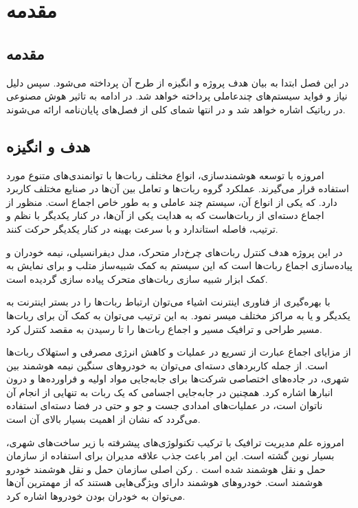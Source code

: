 \chapter{مقدمه}

\section{مقدمه}

در این فصل ابتدا به بیان هدف پروژه و انگیزه از طرح آن پرداخته می‌شود. سپس دلیل نیاز و فواید سیستم‌های چندعاملی پرداخته خواهد شد. در ادامه به تاثیر هوش مصنوعی در رباتیک اشاره خواهد شد و در انتها شمای کلی از فصل‌های پایان‌نامه ارائه می‌شوند.

\section{هدف و انگیزه}
امروزه با توسعه هوشمندسازی، انواع مختلف ربات‌ها با توانمندی‌های متنوع مورد استفاده قرار می‌گیرند. عملکرد گروه ربات‌ها و تعامل بین آن‌ها در صنایع مختلف کاربرد دارد. که یکی از انواع آن، سیستم چند عاملی و به طور خاص اجماع است. منظور از اجماع دسته‌ای از ربات‌هاست که به هدایت یکی از آن‌ها، در کنار یکدیگر با نظم و ترتیب، فاصله استاندارد و با سرعت بهینه در کنار یکدیگر حرکت کنند.

در این پروژه هدف کنترل ربات‌های چرخ‌دار متحرک، مدل دیفرانسیلی، نیمه خودران و پیاده‌سازی اجماع ربات‌ها است که این سیستم به کمک شبیه‌ساز متلب و برای نمایش به کمک ابزار شبیه سازی ربات‌های متحرک پیاده سازی گردیده است.

با بهره‌گیری از فناوری اینترنت اشیاء می‌توان ارتباط ربات‌ها را در بستر اینترنت به یکدیگر و یا به مراکز مختلف میسر نمود. به این ترتیب می‌توان به کمک آن برای ربات‌ها مسیر طراحی‌ و ترافیک مسیر و اجماع ربات‌ها را تا رسیدن به مقصد کنترل کرد.

از مزایای اجماع عبارت از تسریع در عملیات‌ و کاهش انرژی مصرفی و استهلاک ربات‌ها است. از جمله کاربردهای دسته‌ای می‌توان به خودروهای سنگین نیمه هوشمند بین شهری، در جاده‌های اختصاصی شرکت‌ها برای جابه‌جایی مواد اولیه و فراورده‌ها و درون انبارها اشاره کرد. همچنین در جابه‌جایی اجسامی که یک ربات به تنهایی از انجام آن ناتوان است، در عملیات‌های امدادی جست و جو و حتی در فضا دسته‌ای استفاده می‌گردد که نشان از اهمیت بسیار بالای آن است.

امروزه علم مدیریت ترافیک با ترکیب تکنولوژی‌های پیشرفته با زیر ساخت‌های شهری، بسیار نوین گشته است. این امر باعث جذب علاقه مدیران برای استفاده از سازمان حمل و نقل هوشمند شده است \cite{baskar2011traffic}. رکن اصلی سازمان حمل و نقل هوشمند خودرو هوشمند است. خودروهای هوشمند دارای ویژگی‌هایی هستند که از مهمترین آن‌ها می‌توان به خودران بودن خودروها اشاره کرد.

